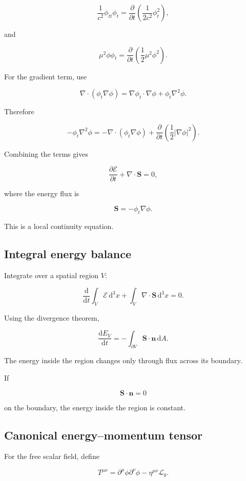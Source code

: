 \[
\frac{1}{c^{2}}\phi_{tt}\phi_{t}
=
\frac{\partial}{\partial t}
\left(
\frac{1}{2c^{2}}\phi_{t}^{2}
\right),
\]

and

\[
\mu^{2}\phi\phi_{t}
=
\frac{\partial}{\partial t}
\left(
\frac{1}{2}\mu^{2}\phi^{2}
\right).
\]

For the gradient term, use

\[
\nabla\cdot
(\phi_{t}\nabla\phi)
=
\nabla\phi_{t}\cdot\nabla\phi
+
\phi_{t}\nabla^{2}\phi.
\]

Therefore

\[
-\phi_{t}\nabla^{2}\phi
=
-\nabla\cdot
(\phi_{t}\nabla\phi)
+
\frac{\partial}{\partial t}
\left(
\frac{1}{2}|\nabla\phi|^{2}
\right).
\]

Combining the terms gives

\[
\boxed{
\frac{\partial\mathcal{E}}{\partial t}
+
\nabla\cdot\mathbf{S}
=0
},
\]

where the energy flux is

\[
\boxed{
\mathbf{S}
=
-\phi_{t}\nabla\phi
}.
\]

This is a local continuity equation.

\subsection{Integral energy balance}

Integrate over a spatial region \(V\):

\[
\frac{\mathrm{d}}{\mathrm{d}t}
\int_{V}\mathcal{E}\,\mathrm{d}^{3}x
+
\int_{V}\nabla\cdot\mathbf{S}\,\mathrm{d}^{3}x
=0.
\]

Using the divergence theorem,

\[
\boxed{
\frac{\mathrm{d}E_{V}}{\mathrm{d}t}
=
-
\int_{\partial V}
\mathbf{S}\cdot\mathbf{n}
\,\mathrm{d}A
}.
\]

The energy inside the region changes only through flux across its boundary.

If

\[
\mathbf{S}\cdot\mathbf{n}=0
\]

on the boundary, the energy inside the region is constant.

\subsection{Canonical energy--momentum tensor}

For the free scalar field, define

\[
\boxed{
T^{\mu\nu}
=
\partial^{\mu}\phi
\partial^{\nu}\phi
-
\eta^{\mu\nu}\mathcal{L}_{0}
}.
\]

